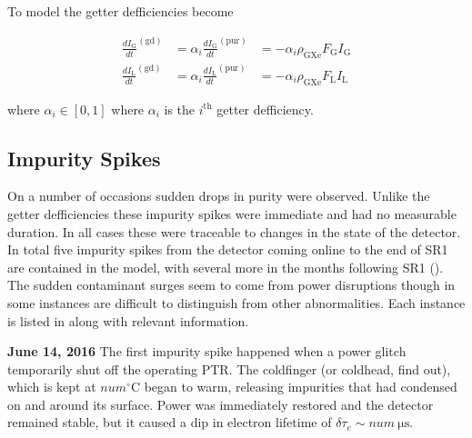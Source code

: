 To model the getter defficiencies 
become

\begin{subequations}
\begin{align}
\frac{dI_{\mathrm{G}}}{dt}^{(\mathrm{gd})} &= \alpha_i \frac{dI_{\mathrm{G}}}{dt}^{(\mathrm{pur})} &=
-\alpha_i \rho_{\mathrm{GXe}} F_{\mathrm{G}} I_{\mathrm{G}}
\label{eq:electron_lifetime_model_detector_effects_getter_gxe}
\\
\frac{dI_{\mathrm{L}}}{dt}^{(\mathrm{gd})} &= \alpha_i \frac{dI_{\mathrm{L}}}{dt}^{(\mathrm{pur})} &=
-\alpha_i \rho_{\mathrm{GXe}} F_{\mathrm{L}} I_{\mathrm{L}}
\label{eq:electron_lifetime_model_detector_effects_getter_lxe}
\end{align}
\end{subequations}

\noindent where $\alpha_i \in [0, 1]$ where $\alpha_i$ is the $i^{\mathrm{th}}$ getter defficiency.



\subsection{Impurity Spikes}
\label{subsec:electron_lifetime_model_detector_effects_spikes}
On a number of occasions sudden drops in purity were observed.  Unlike the getter defficiencies these impurity spikes were immediate and
had no measurable duration.  In all cases these were traceable to changes in the state of the detector.  In total five impurity spikes
from the detector coming online to the end of SR1 are contained in the model, with several more in the months following SR1
().  The
sudden contaminant surges seem to come from power disruptions though in some instances are difficult to distinguish from other
abnormalities.  Each instance is listed in  along with relevant
information.

\textbf{June 14, 2016}  The first impurity spike happened when a power glitch temporarily shut off the operating PTR.  The coldfinger (or
coldhead, find out), which is kept at $num^{\circ} \mathrm{C}$ began to warm, releasing impurities that had condensed on and around its
surface.  Power was immediately restored and the detector remained stable, but it caused a dip in electron lifetime of
$\delta \tau_e \sim num\ \mathrm{\mu s}$.

